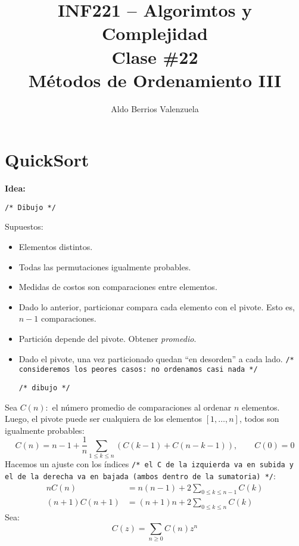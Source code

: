 \documentclass[english, spanish, fleqn, 10pt]{article}
\author{Aldo Berrios Valenzuela}
\title{INF221 -- Algorimtos y Complejidad\\[.4\baselineskip]
	Clase \#22\\
	Métodos de Ordenamiento III}
\newcommand{\comillas}[1]{``#1''}
\newcommand{\comentarioc}[1]{\texttt{\textcolor{webred}{/* #1 */}}}
\numberwithin{equation}{section}
\newcommand{\nparentesis}[1]{\left( #1 \right)}
\newcommand{\ncorchetes}[1]{\left[ #1 \right]}
\theoremstyle{definition}
\begin{document}
\maketitle
\section{QuickSort}
\textbf{Idea:}
\begin{center}
	\comentarioc{Dibujo}
\end{center}
Supuestos:
\begin{itemize}
	\item Elementos distintos.
	\item Todas las permutaciones igualmente probables.
	\item Medidas de costos son comparaciones entre elementos.
	\item Dado lo anterior, particionar compara cada elemento con el pivote. Esto es, $n-1$ comparaciones.
	\item Partición depende del pivote. Obtener \emph{promedio}.
	\item Dado el pivote, una vez particionado quedan \comillas{en desorden} a cada lado. \comentarioc{consideremos los peores casos: no ordenamos casi nada}
	
	\begin{center}
		\comentarioc{dibujo}
	\end{center}
\end{itemize}
Sea $C\nparentesis{n}:$ el número promedio de comparaciones al ordenar $n$ elementos. Luego, el pivote puede ser cualquiera de los elementos $\ncorchetes{1, \ldots, n}$, todos son igualmente probables:
\begin{equation}
C\nparentesis{n} = n-1+\dfrac{1}{n}\sum_{1\leq k \leq n}\nparentesis{C\nparentesis{k-1}+C\nparentesis{n-k-1}},\qquad C\nparentesis{0}=0
\end{equation}
Hacemos un ajuste con los índices \comentarioc{el C de la izquierda va en subida y el de la derecha va en bajada (ambos dentro de la sumatoria)}:
\begin{align*}
n C \nparentesis{n} &= n\nparentesis{n-1} + 2\sum_{0 \leq k \leq n-1}C\nparentesis{k}\\
\nparentesis{n+1} C\nparentesis{n+1} &= \nparentesis{n+1}n + 2\sum_{0 \leq k \leq n} C\nparentesis{k}
\end{align*}
Sea:
\begin{equation*}
C\nparentesis{z} = \sum_{n \geq 0} C\nparentesis{n} z^n
\end{equation*}
\end{document}
